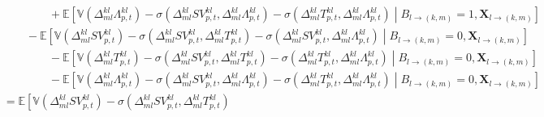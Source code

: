 \begin{linenomath*}
\begin{equation*}
\begin{aligned}
                    & \qquad \qquad \qquad + 
                        \mathbb{E}
                        \left[
                            \mathbb{V}\left(\Delta_{ml}^{kl}\Lambda_{p,t}^{kl}\right)
                                - \sigma\left(\Delta_{ml}^{kl}SV_{p,t}^{kl},\Delta_{ml}^{kl}\Lambda_{p,t}^{kl}\right)
                                - \sigma\left(\Delta_{ml}^{kl}T_{p,t}^{kl},\Delta_{ml}^{kl}\Lambda_{p,t}^{kl}\right)
                            \middle\vert  B_{l \rightarrow (k,m)} = 1, \boldsymbol{X}_{l \rightarrow (k,m)}
                        \right] \\
                & \qquad \qquad -  
                    \mathbb{E}
                    \left[
                        \mathbb{V}\left(\Delta_{ml}^{kl}SV_{p,t}^{kl}\right)
                            - \sigma\left(\Delta_{ml}^{kl}SV_{p,t}^{kl},\Delta_{ml}^{kl}T_{p,t}^{kl}\right)
                            - \sigma\left(\Delta_{ml}^{kl}SV_{p,t}^{kl},\Delta_{ml}^{kl}\Lambda_{p,t}^{kl}\right)
                        \middle\vert  B_{l \rightarrow (k,m)} = 0, \boldsymbol{X}_{l \rightarrow (k,m)}
                    \right] \\
                        & \qquad \qquad \qquad -
                        \mathbb{E}
                        \left[
                            \mathbb{V}\left(\Delta_{ml}^{kl}T_{p,t}^{kl}\right)
                                - \sigma\left(\Delta_{ml}^{kl}SV_{p,t}^{kl},\Delta_{ml}^{kl}T_{p,t}^{kl}\right)
                                - \sigma\left(\Delta_{ml}^{kl}T_{p,t}^{kl},\Delta_{ml}^{kl}\Lambda_{p,t}^{kl}\right)
                            \middle\vert  B_{l \rightarrow (k,m)} = 0, \boldsymbol{X}_{l \rightarrow (k,m)}
                        \right] \\
                        & \qquad \qquad \qquad -
                            \mathbb{E}
                            \left[
                                \mathbb{V}\left(\Delta_{ml}^{kl}\Lambda_{p,t}^{kl}\right)
                                    - \sigma\left(\Delta_{ml}^{kl}SV_{p,t}^{kl},\Delta_{ml}^{kl}\Lambda_{p,t}^{kl}\right)
                                    - \sigma\left(\Delta_{ml}^{kl}T_{p,t}^{kl},\Delta_{ml}^{kl}\Lambda_{p,t}^{kl}\right)
                                \middle\vert  B_{l \rightarrow (k,m)} = 0, \boldsymbol{X}_{l \rightarrow (k,m)}
                            \right] \\
            & \qquad = 
                \mathbb{E}
                \left[
                    \mathbb{V}\left(\Delta_{ml}^{kl}SV_{p,t}^{kl}\right)
                        - \sigma\left(\Delta_{ml}^{kl}SV_{p,t}^{kl},\Delta_{ml}^{kl}T_{p,t}^{kl}\right)

\end{aligned}
\end{equation*}
\end{linenomath*}
